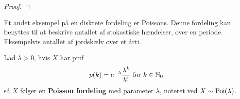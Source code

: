 \begin{proof}
\end{proof}

Et andet eksempel på en diskrete fordeling er Poissons. Denne fordeling kan benyttes til at beskrive antallet af stokastiske hændelser, over en periode. Eksempelvis antallet af jordskælv over et årti.
\begin{defn}\label{def:poisson}
    Lad $\lambda>0$, hvis $X$ har pmf
    \begin{align*}
         p(k)=\mathrm{e}^{-\lambda}\frac{\lambda^k}{k!}\text{ for } k\in\mathbb{N}_0
    \end{align*}
    så $X$ følger en \textbf{Poisson fordeling} med parameter $\lambda$, noteret ved $X\sim\textnormal{Poi}(\lambda)$.
\end{defn}

